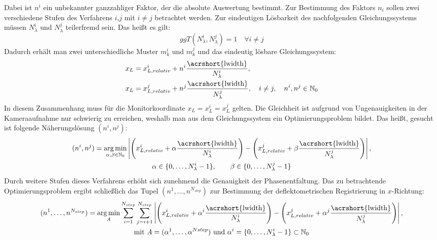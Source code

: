 %
Dabei ist $n^i$ ein unbekannter ganzzahliger Faktor, der die absolute Auswertung bestimmt.
Zur Bestimmung des Faktors $n_i$ sollen zwei verschiedene Stufen des Verfahrens $i$,$j$ mit $i \neq j$ betrachtet werden.
Zur eindeutigen Lösbarkeit des nachfolgenden Gleichungssystems müssen $N_\lambda^i$ und $N_\lambda^j$ teilerfremd sein.
Das heißt es gilt:
%
\begin{equation*}
	ggT(N_\lambda^i, N_\lambda^j) = 1
	\quad
	\forall i \neq j
\end{equation*}
%
Dadurch erhält man zwei unterschiedliche Muster $m_k^i$ und $m_k^j$ und das eindeutig lösbare Gleichungssystem:
%
\begin{equation}\label{eq:gleichungssystemRegistrierung}
	\begin{split}
		x_L & = x_{L,relativ}^i + n^i \dfrac{\text{\acrshort{lwidth}}}{N_\lambda^i},\\
		x_L & = x_{L,relativ}^j + n^j \dfrac{\text{\acrshort{lwidth}}}{N_\lambda^j},
		\quad i \neq j,
		\quad n^i, n^j \in \mathbb{N}_0
	\end{split}
\end{equation}
%
In diesem Zusammenhang muss für die Monitorkoordinate $x_L = x_L^i = x_L^j$ gelten.
Die Gleichheit ist aufgrund von Ungenauigkeiten in der Kameraaufnahme nur schwierig zu erreichen, weshalb man aus dem Gleichungssystem ein Optimierungsproblem bildet.
Das heißt, gesucht ist folgende Näherungslösung $(n^i, n^j)$:
%
\begin{equation}\label{eq:optimierungsProblem_zweiStufen}
	\begin{gathered}	
		(n^i, n^j) = \argmin_{\alpha, \beta \in \mathbb{N}_0}
		\left\lvert
			\Bigg(
				x_{L,relativ}^i + \alpha \dfrac{\text{\acrshort{lwidth}}}{N_\lambda^i}
			\Bigg)
			-
			\Bigg(		
				x_{L,relativ}^j + \beta \dfrac{\text{\acrshort{lwidth}}}{N_\lambda^j}
			\Bigg)
		\right\rvert,\\
		\alpha \in \lbrace 0,\ldots, N_\lambda^i - 1\rbrace,
		\qquad
		\beta \in \lbrace 0,\ldots, N_\lambda^j - 1\rbrace
	\end{gathered}
\end{equation}
%
Durch weitere Stufen dieses Verfahrens erhöht sich zunehmend die Genauigkeit der Phasenentfaltung.
Das zu betrachtende Optimierungsproblem ergibt schließlich das Tupel $(n^1,\ldots, n^{N_{step}})$ zur Bestimmung der deflektometrischen Registrierung in $x$-Richtung:
%
\begin{equation}\label{eq:optimierungsProblem_mehrstufig}
	\begin{gathered}	
		(n^1,\ldots, n^{N_{step}}) = \argmin_{\mathrm{\textit{A}}}
		\sum\limits_{i = 1}^{N_{step}}
		\sum\limits_{j = i + 1}^{N_{step}}
		\left\lvert
			\Bigg(
				x_{L,relativ}^i + \alpha^i \dfrac{\text{\acrshort{lwidth}}}{N_\lambda^i}
			\Bigg)
			-
			\Bigg(		
				x_{L,relativ}^j + \alpha^j \dfrac{\text{\acrshort{lwidth}}}{N_\lambda^j}
			\Bigg)
		\right\rvert,\\
		\text{mit} ~\mathrm{\textit{A}} = (\alpha^1,\ldots,\alpha^{N{step}}) ~\text{und} ~\alpha^i = \lbrace 0,\ldots, N_\lambda^i - 1 \rbrace \subset \mathbb{N}_0
	\end{gathered}
\end{equation}
